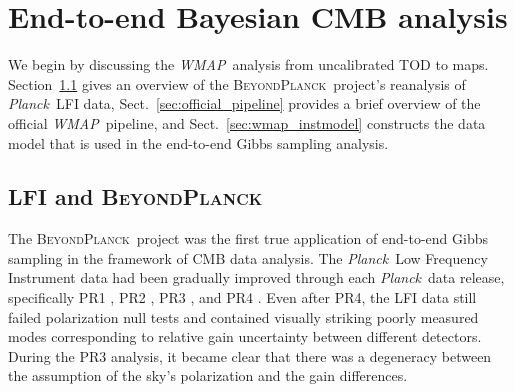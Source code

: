 \documentclass[twocolumn]{../../common/aa}
\def\WMAP{\emph{WMAP}}
\def\WMAPnine{\emph{WMAP9}}
\def\Planck{\emph{Planck}}
\def\commanderthree{\texttt{Commander3}}
\newcommand{\bp}{\textsc{BeyondPlanck}}
\newcommand{\cosmoglobe}{\textsc{Cosmoglobe}}
\begin{document}
%
%


\section{End-to-end Bayesian CMB analysis}
\label{sec:methods}

We begin by discussing the \WMAP\ analysis from uncalibrated TOD to maps. Section~\ref{sec:lfi_bp} gives an overview of the \bp\ project's reanalysis of \Planck\ LFI data, Sect.~\ref{sec:official_pipeline} provides a brief overview of the official \WMAP\ pipeline, and Sect.~\ref{sec:wmap_instmodel} constructs the data model that is used in the end-to-end Gibbs sampling analysis.

\subsection{LFI and \bp}
\label{sec:lfi_bp}

The \bp\ project \citep{bp01} was the first true application of end-to-end Gibbs sampling in the framework of CMB data analysis. The \Planck\ Low Frequency Instrument data had been gradually improved through each \Planck\ data release, specifically  PR1 \citep{planck2014-a03}, PR2 \citep{planck2014-a03}, PR3 \citep{planck2016-l02}, and PR4 \citep{planck2014-a03}. Even after PR4, the LFI data still failed polarization null tests and contained visually striking poorly measured modes corresponding to relative gain uncertainty between different detectors. During the PR3 analysis, it became clear that there was a degeneracy between the assumption of the sky's polarization and the gain differences. 
\end{document}

